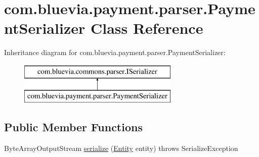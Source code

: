 \hypertarget{classcom_1_1bluevia_1_1payment_1_1parser_1_1PaymentSerializer}{
\section{com.bluevia.payment.parser.PaymentSerializer Class Reference}
\label{classcom_1_1bluevia_1_1payment_1_1parser_1_1PaymentSerializer}
}
Inheritance diagram for com.bluevia.payment.parser.PaymentSerializer:\begin{figure}[H]
\begin{center}
\leavevmode
\includegraphics[height=2.000000cm]{classcom_1_1bluevia_1_1payment_1_1parser_1_1PaymentSerializer}
\end{center}
\end{figure}
\subsection*{Public Member Functions}
\begin{DoxyCompactItemize}
\item 
ByteArrayOutputStream \hyperlink{classcom_1_1bluevia_1_1payment_1_1parser_1_1PaymentSerializer_ab1f15847cca41f48841e3f2175a552b3}{serialize} (\hyperlink{interfacecom_1_1bluevia_1_1commons_1_1Entity}{Entity} entity)  throws SerializeException 
\end{DoxyCompactItemize}


